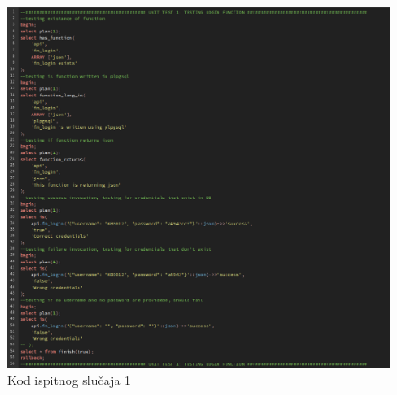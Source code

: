 				\begin{figure}[H]
					\centering
					\includegraphics[width=\textwidth]{slike/unit_tests/ut_1/code.png}
					\caption{Kod ispitnog slučaja 1}
					\label{fig: IS1-kod}
				\end{figure}
				\eject
